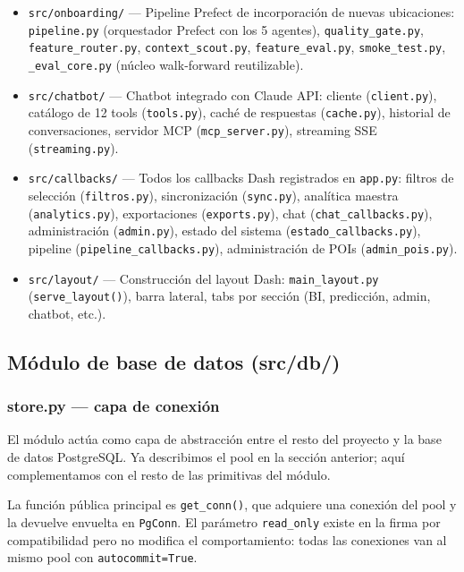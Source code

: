 \documentclass[12pt, a4paper]{article}
\begin{document}
\begin{itemize}
  \item \texttt{src/onboarding/} — Pipeline Prefect de incorporación de nuevas ubicaciones: \texttt{pipeline.py} (orquestador Prefect con los 5 agentes), \texttt{quality\_gate.py}, \texttt{feature\_router.py}, \texttt{context\_scout.py}, \texttt{feature\_eval.py}, \texttt{smoke\_test.py}, \texttt{\_eval\_core.py} (núcleo walk-forward reutilizable).

  \item \texttt{src/chatbot/} — Chatbot integrado con Claude API: cliente (\texttt{client.py}), catálogo de 12 tools (\texttt{tools.py}), caché de respuestas (\texttt{cache.py}), historial de conversaciones, servidor MCP (\texttt{mcp\_server.py}), streaming SSE (\texttt{streaming.py}).

  \item \texttt{src/callbacks/} — Todos los callbacks Dash registrados en \texttt{app.py}: filtros de selección (\texttt{filtros.py}), sincronización (\texttt{sync.py}), analítica maestra (\texttt{analytics.py}), exportaciones (\texttt{exports.py}), chat (\texttt{chat\_callbacks.py}), administración (\texttt{admin.py}), estado del sistema (\texttt{estado\_callbacks.py}), pipeline (\texttt{pipeline\_callbacks.py}), administración de POIs (\texttt{admin\_pois.py}).

  \item \texttt{src/layout/} — Construcción del layout Dash: \texttt{main\_layout.py} (\texttt{serve\_layout()}), barra lateral, tabs por sección (BI, predicción, admin, chatbot, etc.).
\end{itemize}

\subsection{Módulo de base de datos (src/db/)}

\subsubsection{store.py — capa de conexión}

El módulo  actúa como capa de abstracción entre el resto del proyecto y la base de datos PostgreSQL. Ya describimos el pool en la sección anterior; aquí complementamos con el resto de las primitivas del módulo.

La función pública principal es \texttt{get\_conn()}, que adquiere una conexión del pool y la devuelve envuelta en \texttt{PgConn}. El parámetro \texttt{read\_only} existe en la firma por compatibilidad pero no modifica el comportamiento: todas las conexiones van al mismo pool con \texttt{autocommit=True}.
\end{document}

